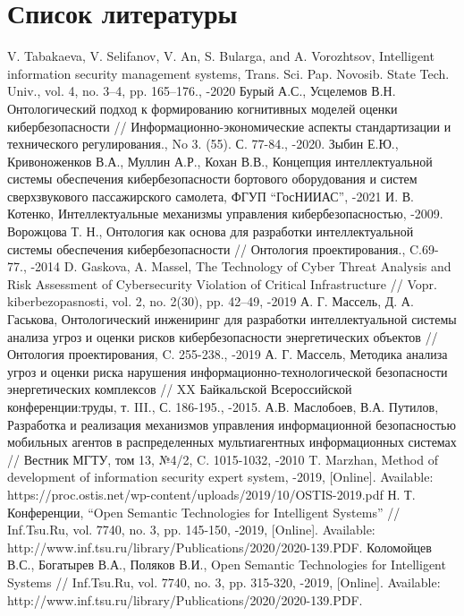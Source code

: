 \section{Список литературы}
\medskip

\begin{thebibliography}{}
V. Tabakaeva, V. Selifanov, V. An, S. Bularga, and A. Vorozhtsov,
Intelligent information security management systems,  Trans. Sci. Pap. Novosib. State Tech. Univ., vol. 4,
no. 3–4, pp. 165–176., -2020
Бурый А.С., Усцелемов В.Н. Онтологический подход к формированию когнитивных моделей оценки
кибербезопасности // Информационно-экономические аспекты стандартизации и технического
регулирования.,  No 3. (55). С. 77-84., -2020.
Зыбин Е.Ю., Кривоноженков В.А., Муллин А.Р., Кохан В.В., Концепция
интеллектуальной системы обеспечения кибербезопасности бортового оборудования
и систем сверхзвукового пассажирского самолета, ФГУП ``ГосНИИАС'', -2021
И. В. Котенко, Интеллектуальные механизмы управления кибербезопасностью, -2009.
Ворожцова Т. Н., Онтология как основа для разработки интеллектуальной системы обеспечения
кибербезопасности // Онтология проектирования., C.69-77., -2014
D. Gaskova, A. Massel, The Technology of Cyber Threat Analysis and Risk Assessment of Cybersecurity
Violation of Critical Infrastructure // Vopr. kiberbezopasnosti, vol. 2, no. 2(30), pp. 42–49, -2019
А. Г. Массель, Д. А. Гаськова, Онтологический инжениринг для разработки интеллектуальной системы анализа угроз
и оценки рисков кибербезопасности энергетических объектов // Онтология проектирования, C. 255-238., -2019
А. Г. Массель, Методика анализа угроз и оценки риска нарушения информационно-технологической
безопасности энергетических комплексов // XX Байкальской Всероссийской конференции:труды,
т. III., С. 186-195., -2015.
А.В. Маслобоев, В.А. Путилов, Разработка и реализация механизмов управления информационной безопасностью
мобильных агентов в распределенных мультиагентных информационных системах // Вестник МГТУ, том 13, №4/2,
C. 1015-1032, -2010
T. Marzhan, Method of development of information security expert system, -2019, [Online].
Available: https://proc.ostis.net/wp-content/uploads/2019/10/OSTIS-2019.pdf
Н. Т. Конференции, “Open Semantic Technologies for Intelligent Systems”
// Inf.Tsu.Ru, vol. 7740, no. 3, pp. 145-150, -2019,
[Online]. Available: http://www.inf.tsu.ru/library/Publications/2020/2020-139.PDF.
Коломойцев В.С., Богатырев В.А., Поляков В.И., Open Semantic Technologies for Intelligent Systems
// Inf.Tsu.Ru, vol. 7740, no. 3, pp. 315-320, -2019,
[Online]. Available: http://www.inf.tsu.ru/library/Publications/2020/2020-139.PDF.
\end{thebibliography}


